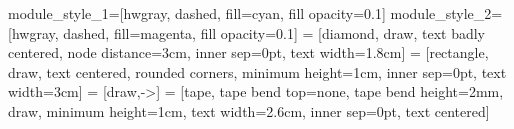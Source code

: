 \usepackage{booktabs}
\usepackage{makecell}

\usepackage[disable]{todonotes}
\usepackage{subfiles}

\usepackage[binary-units=true]{siunitx}



\tikzstyle module_style_1=[hwgray, dashed, fill=cyan, fill opacity=0.1]
\tikzstyle module_style_2=[hwgray, dashed, fill=magenta, fill opacity=0.1]
 = [diamond, draw, text badly centered, node distance=3cm, inner sep=0pt, text width=1.8cm]
 = [rectangle, draw, text centered, rounded corners, minimum height=1cm, inner sep=0pt, text width=3cm] 
 = [draw,->]
 = [tape, tape bend top=none, tape bend height=2mm, draw, minimum height=1cm, text width=2.6cm, inner sep=0pt, text centered]

